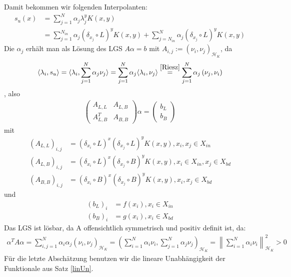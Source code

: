 Damit bekommen wir folgenden Interpolanten:
\begin{align*}
s_u(x) &= \sum_{j=1}^N \alpha_j \lambda_j^y K(x,y)\\
&= \sum_{j=1}^{N_{in}} \alpha_j (\delta_{x_j} \circ L)^y K(x,y) + \sum_{j=N_{in}}^{N} \alpha_j (\delta_{x_j} \circ L)^y K(x,y)
\end{align*}
Die $\alpha_j$ erhält man als Lösung des \ac{LGS} $A \alpha = b$ mit $A_{i,j} := (\nu_i,\nu_j)_{\mathcal{H}_K}$, da
\begin{align*}
\langle \lambda_i, s_u\rangle = \langle \lambda_i, \sum_{j=1}^N \alpha_j \nu_j \rangle = \sum_{j=1}^N \alpha_j \langle \lambda_i,\nu_j\rangle \overset{\ref{Riesz}}{=} \sum_{j=1}^N \alpha_j \left(\nu_j, \nu_i\right)
\end{align*},
 also
\begin{align*}
\begin{pmatrix}
A_{L,L} & A_{L,B} \\ 
A_{L,B}^T & A_{B,B}
\end{pmatrix} 
\alpha =
\begin{pmatrix}
b_L \\ 
b_B
\end{pmatrix} 
\end{align*}
mit
\begin{align*}
(A_{L,L})_{i,j} &= (\delta_{x_i} \circ L)^x(\delta_{x_j} \circ L)^y K(x,y),x_i, x_j \in X_{in}\\
(A_{L,B})_{i,j} &= (\delta_{x_i} \circ L)^x(\delta_{x_j} \circ B)^y K(x,y),x_i \in X_{in}, x_j \in X_{bd} \\
(A_{B,B})_{i,j} &= (\delta_{x_i} \circ B)^x(\delta_{x_j} \circ B)^y K(x,y), x_i, x_j \in X_{bd}
\end{align*}
und
\begin{align*}
(b_L)_i &= f(x_i), x_i \in X_{in}\\
(b_B)_i &= g(x_i), x_i \in X_{bd}
\end{align*}
Das \ac{LGS} ist lösbar, da A offensichtlich symmetrisch und positiv definit ist, da:
\begin{align*}
\alpha^T A \alpha = \sum_{i,j = 1}^N \alpha_i \alpha_j (\nu_i, \nu_j)_{\mathcal{H}_K} = \left(\sum_{i=1}^N \alpha_i \nu_i, \sum_{j=1}^N \alpha_j \nu_j \right)_{\mathcal{H}_K} = \left\| \sum_{i=1}^N \alpha_i \nu_i \right\|_{\mathcal{H}_K}^2 > 0
\end{align*}
Für die letzte Abschätzung benutzen wir die lineare Unabhängigkeit der Funktionale aus Satz \ref{linUn}.
